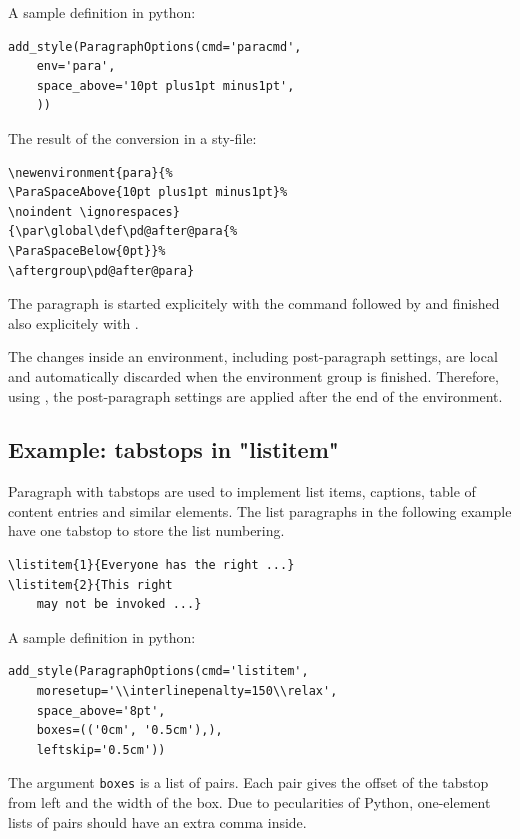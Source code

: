 \documentclass[]{ltugboat}
\begin{document}
A sample definition in python:

\begin{verbatim}
add_style(ParagraphOptions(cmd='paracmd',
    env='para',
    space_above='10pt plus1pt minus1pt',
    ))
\end{verbatim}

The result of the conversion in a sty-file:

\begin{verbatim}
\newenvironment{para}{%
\ParaSpaceAbove{10pt plus1pt minus1pt}%
\noindent \ignorespaces}
{\par\global\def\pd@after@para{%
\ParaSpaceBelow{0pt}}%
\aftergroup\pd@after@para}
\end{verbatim}

The paragraph is started explicitely with the command  followed by  and finished also explicitely with .

The changes inside an environment, including post-paragraph settings, are local and automatically discarded when the environment group is finished. Therefore, using , the post-paragraph settings are applied after the end of the environment.

\subsection{Example: tabstops in "listitem"}

Paragraph with tabstops are used to implement list items, captions, table of content entries and similar elements. The list paragraphs in the following example have one tabstop to store the list numbering.

\begin{verbatim}
\listitem{1}{Everyone has the right ...}
\listitem{2}{This right
    may not be invoked ...}
\end{verbatim}

A sample definition in python:

\begin{verbatim}
add_style(ParagraphOptions(cmd='listitem',
    moresetup='\\interlinepenalty=150\\relax',
    space_above='8pt',
    boxes=(('0cm', '0.5cm'),),
    leftskip='0.5cm'))
\end{verbatim}

The argument \verb|boxes| is a list of pairs. Each pair gives the offset of the tabstop from left and the width of the box. Due to pecularities of Python, one-element lists of pairs should have an extra comma inside.
\end{document}
